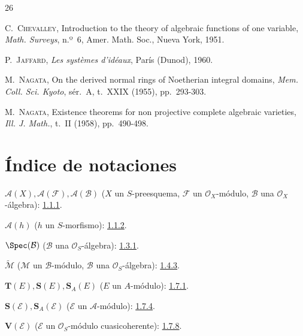 \documentclass[oneside,10pt]{amsart}
\newcommand{\oldpage}[2][]{\marginnote{\normalfont\footnotesize\textbf{#1}~|~#2}\ignorespaces}
\begin{document}
{}
\renewcommand{\refname}{Bibliografía \textit{(continuación)}}

\begin{thebibliography}{26}

C.~\textsc{Chevalley},
Introduction to the theory of algebraic functions of one variable,
\emph{Math. Surveys}, n.º~6, Amer. Math. Soc., Nueva York, 1951.

P.~\textsc{Jaffard},
\emph{Les systèmes d'idéaux}, París (Dunod), 1960.

M.~\textsc{Nagata},
On the derived normal rings of Noetherian integral domains,
\emph{Mem. Coll. Sci. Kyoto}, sér.~A, t.~XXIX (1955), pp.~293-303.

M.~\textsc{Nagata},
Existence theorems for non projective complete algebraic varieties,
\emph{Ill. J. Math.}, t.~II (1958), pp.~490-498.

\end{thebibliography}
\clearpage

\clearpage
\oldpage[II]{207}
{}
\section*{Índice de notaciones}

\begingroup
\small
\setlength{\parindent}{0pt}
\setlength{\parskip}{2pt}

$\mathcal{A}(X),\mathcal{A}(\mathcal{F}),\mathcal{A}(\mathcal{B})$
($X$ un $S$-preesquema, $\mathcal{F}$ un $\mathcal{O}_X$-módulo,
$\mathcal{B}$ una $\mathcal{O}_X$-álgebra): \hyperref[II.1.1.1-fr]{1.1.1}.

$\mathcal{A}(h)$ ($h$ un $S$-morfismo): \hyperref[II.1.1.2-fr]{1.1.2}.

$\Spec(\mathcal{B})$ ($\mathcal{B}$ una $\mathcal{O}_S$-álgebra): \hyperref[II.1.3.1-fr]{1.3.1}.

$\widetilde{\mathcal{M}}$ ($\mathcal{M}$ un $\mathcal{B}$-módulo,
$\mathcal{B}$ una $\mathcal{O}_S$-álgebra): \hyperref[II.1.4.3-fr]{1.4.3}.

$\mathbf{T}(E),\mathbf{S}(E),\mathbf{S}_A(E)$ ($E$ un $A$-módulo): \hyperref[II.1.7.1-fr]{1.7.1}.

$\mathbf{S}(\mathcal{E}),\mathbf{S}_A(\mathcal{E})$
($\mathcal{E}$ un $\mathcal{A}$-módulo): \hyperref[II.1.7.4-fr]{1.7.4}.

$\mathbf{V}(\mathcal{E})$ ($\mathcal{E}$ un $\mathcal{O}_S$-módulo cuasicoherente): \hyperref[II.1.7.8-fr]{1.7.8}.
\end{document}
